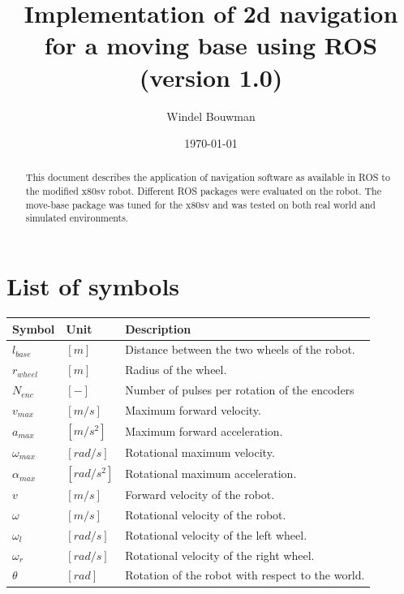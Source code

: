 \documentclass[a4paper]{article}
\begin{document}
\title{Implementation of 2d navigation for a moving base using ROS
(version 1.0)
}
\date{\today}
\author{Windel Bouwman}

\maketitle
\begin{abstract}
This document describes the application of navigation software
as available in ROS to the modified x80sv robot. Different ROS
packages were evaluated on the robot. The move-base package was
tuned for the x80sv and was tested on both real world
and simulated environments.
\end{abstract}

\tableofcontents

\section*{List of symbols}

\begin{tabular}{ | l | l | l | }
  \hline                       
  Symbol & Unit & Description \\
  \hline                       
  $l_{base}$ & $[m]$ & Distance between the two wheels of the robot. \\
  \hline                       
  $r_{wheel}$ & $[m]$ & Radius of the wheel. \\
  \hline                       
  $N_{enc}$ & $[-]$ & Number of pulses per rotation of the encoders \\
  \hline                       
  $v_{max}$ & $[m/s]$ & Maximum forward velocity. \\
  \hline                       
  $a_{max}$ & $[m/s^2]$ & Maximum forward acceleration. \\
  \hline                       
  $\omega_{max}$ & $[rad/s]$ & Rotational maximum velocity. \\
  \hline                       
  $\alpha_{max}$ & $[rad/s^2]$ & Rotational maximum acceleration. \\
  \hline                       
  $v$ & $[m/s]$ & Forward velocity of the robot. \\
  \hline                       
  $\omega$ & $[m/s]$ & Rotational velocity of the robot. \\
  \hline                       
  $\omega_l$ & $[rad/s]$ & Rotational velocity of the left wheel. \\
  \hline                       
  $\omega_r$ & $[rad/s]$ & Rotational velocity of the right wheel. \\
  \hline                       
  $\theta$ & $[rad]$ & Rotation of the robot with respect to the world. \\
  \hline                       
\end{tabular}
\end{document}
